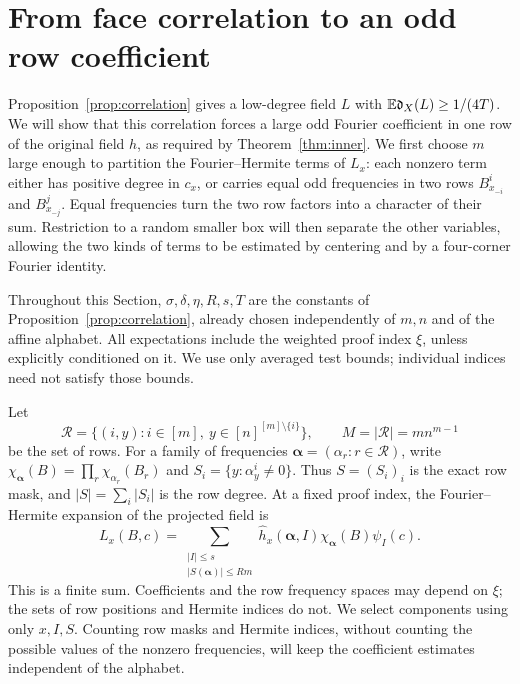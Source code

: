 \section{From face correlation to an odd row coefficient}
\label{sec:inner-box}

Proposition~\ref{prop:correlation} gives a low-degree field $L$ with
$\mathbb E\mathfrak d_X(L)\ge1/(4T)$. We will show that this correlation
forces a large odd Fourier coefficient in one row of the original field
$h$, as required by Theorem~\ref{thm:inner}. We first choose $m$ large enough to partition
the Fourier--Hermite terms of $L_x$: each nonzero term either has positive degree
in $c_x$, or carries equal odd frequencies in two rows
$B^i_{x_{-i}}$ and $B^j_{x_{-j}}$. Equal frequencies turn the two row
factors into a character of their sum. Restriction to a random smaller box
will then separate the other variables, allowing the two kinds of terms
to be estimated by centering and by a four-corner Fourier identity.

Throughout this Section, $\sigma,\delta,\eta,R,s,T$ are the constants of
Proposition~\ref{prop:correlation}, already chosen independently of
$m,n$ and of the affine alphabet. All expectations include the weighted
proof index $\xi$, unless explicitly conditioned on it. We use only
averaged test bounds; individual indices need not satisfy those bounds.

Let
\[
 \mathcal R=\{(i,y):i\in[m],\ y\in[n]^{[m]\setminus\{i\}}\},
 \qquad M=|\mathcal R|=mn^{m-1}
\]
be the set of rows. For a family of frequencies
$\boldsymbol\alpha=(\alpha_r:r\in\mathcal R)$, write
$\chi_{\boldsymbol\alpha}(B)=\prod_r\chi_{\alpha_r}(B_r)$ and
$S_i=\{y:\alpha^i_y\ne0\}$. Thus $S=(S_i)_i$ is the exact row mask,
and $|S|=\sum_i|S_i|$ is the row degree. At a fixed proof index, the
Fourier--Hermite expansion of the projected field is
\begin{equation}\label{eq:box-expansion}
 L_x(B,c)=
 \sum_{\substack{|I|\le s\\|S(\boldsymbol\alpha)|\le Rm}}
 \widehat h_x(\boldsymbol\alpha,I)
 \chi_{\boldsymbol\alpha}(B)\psi_I(c).
\end{equation}
This is a finite sum. Coefficients and the row frequency spaces may depend
on $\xi$; the sets of row positions and Hermite indices do not. We select
components using only $x,I,S$. Counting row masks and Hermite indices,
without counting the possible values of the nonzero frequencies,
will keep the coefficient estimates independent of the alphabet.

